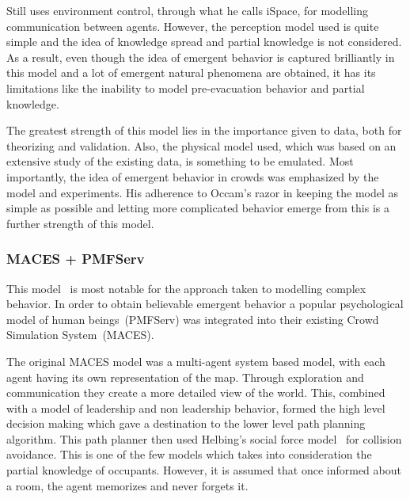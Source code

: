 Still uses environment control, through what he calls iSpace, for modelling communication between agents. However, the perception model used is quite simple and the idea of knowledge spread and partial knowledge is not considered. As a result, even though the idea of emergent behavior is captured brilliantly in this model and a lot of emergent natural phenomena are obtained, it has its limitations like the inability to model pre-evacuation behavior and partial knowledge.

The greatest strength of this model lies in the importance given to data, both for theorizing and validation. Also, the physical model used, which was based on an extensive study of the existing data, is something to be emulated. Most importantly, the idea of emergent behavior in crowds was emphasized by the model and experiments. His adherence to Occam's razor in keeping the model as simple as possible and letting more complicated behavior emerge from this is a further strength of this model.


\subsubsection{MACES + PMFServ}
\label{MACESPMFServ}

This model~\cite{Pelechano:2005vp} is most notable for the approach taken to modelling complex behavior. In order to obtain believable emergent behavior a popular psychological model of human beings~(PMFServ) was integrated into their existing Crowd Simulation System~(MACES).

The original MACES model was a multi-agent system based model, with each agent having its own representation of the map. Through exploration and communication they create a more detailed view of the world. This, combined with a model of leadership and non leadership behavior, formed the high level decision making which gave a destination to the lower level path planning algorithm. This path planner then used Helbing's social force model~\cite{Helbing:1995ie} for collision avoidance. This is one of the few models which takes into consideration the partial knowledge of occupants. However, it is assumed that once informed about a room, the agent memorizes and never forgets it.

